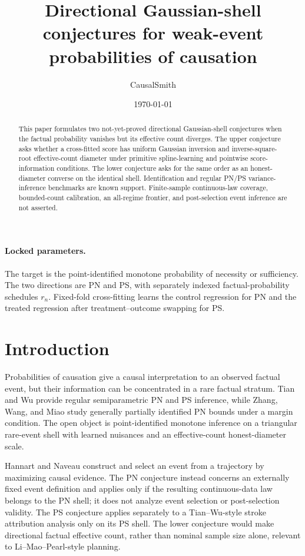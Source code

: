 \documentclass[11pt]{article}
\title{Directional Gaussian-shell conjectures for weak-event probabilities of causation}
\author{CausalSmith}
\date{\today}
\begin{document}
\maketitle

\paragraph{Locked parameters.}
The target is the point-identified monotone probability of necessity or sufficiency.  The two directions are PN and PS, with separately indexed factual-probability schedules \(r_n\).  Fixed-fold cross-fitting learns the control regression for PN and the treated regression after treatment--outcome swapping for PS.

\begin{abstract}
This paper formulates two not-yet-proved directional Gaussian-shell conjectures when the factual probability vanishes but its effective count diverges.  The upper conjecture asks whether a cross-fitted score has uniform Gaussian inversion and inverse-square-root effective-count diameter under primitive spline-learning and pointwise score-information conditions.  The lower conjecture asks for the same order as an honest-diameter converse on the identical shell.  Identification and regular PN/PS variance-inference benchmarks are known support.  Finite-sample continuous-law coverage, bounded-count calibration, an all-regime frontier, and post-selection event inference are not asserted.
\end{abstract}

\section{Introduction}
Probabilities of causation give a causal interpretation to an observed factual event, but their information can be concentrated in a rare factual stratum.  Tian and Wu provide regular semiparametric PN and PS inference, while Zhang, Wang, and Miao study generally partially identified PN bounds under a margin condition.  The open object is point-identified monotone inference on a triangular rare-event shell with learned nuisances and an effective-count honest-diameter scale.

Hannart and Naveau construct and select an event from a trajectory by maximizing causal evidence.  The PN conjecture instead concerns an externally fixed event definition and applies only if the resulting continuous-data law belongs to the PN shell; it does not analyze event selection or post-selection validity.  The PS conjecture applies separately to a Tian--Wu-style stroke attribution analysis only on its PS shell.  The lower conjecture would make directional factual effective count, rather than nominal sample size alone, relevant to Li--Mao--Pearl-style planning.
\end{document}
